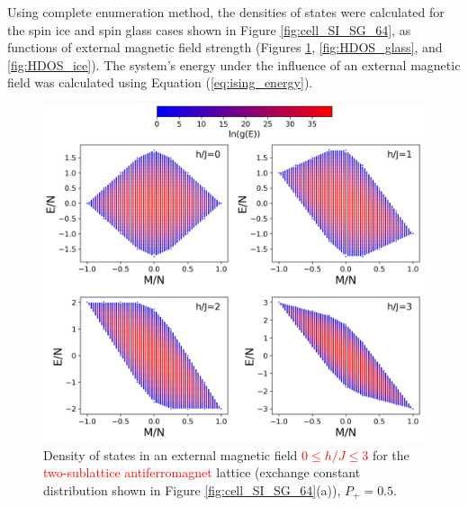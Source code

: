 \documentclass[preprint,12pt]{elsarticle}
\begin{document}
	Using complete enumeration method, the densities of states were calculated for the spin ice and spin glass cases shown in Figure \ref{fig:cell_SI_SG_64}, as functions of external magnetic field strength (Figures \ref{fig:HDOS_ice_1}, \ref{fig:HDOS_glass}, and \ref{fig:HDOS_ice}).
	The system's energy under the influence of an external magnetic field was calculated using Equation (\ref{eq:ising_energy}).
	
	\begin{figure}[H]
		\centering
		\includegraphics[width=1\linewidth]{pictures/HDOS_SI_64_J0_1.png}
		\caption{Density of states in an external magnetic field \textcolor{red}{$0\leq h/J \leq 3$} for the \textcolor{red}{two-sublattice antiferromagnet} lattice (exchange constant distribution shown in Figure \ref{fig:cell_SI_SG_64}(a)), $P_+ = 0.5$.}
		\label{fig:HDOS_ice_1}
	\end{figure}
	
\end{document}

